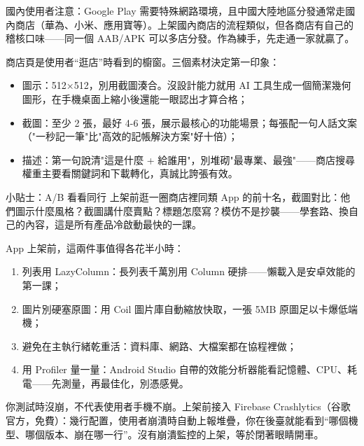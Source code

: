 國內使用者注意：Google Play 需要特殊網路環境，且中國大陸地區分發通常走國內商店（華為、小米、應用寶等）。上架國內商店的流程類似，但各商店有自己的稽核口味——同一個 AAB/APK 可以多店分發。作為練手，先走通一家就贏了。


商店頁是使用者“逛店”時看到的櫥窗。三個素材決定第一印象：

\begin{itemize}
  \item 圖示：512×512，別用截圖湊合。沒設計能力就用 AI 工具生成一個簡潔幾何圖形，在手機桌面上縮小後還能一眼認出才算合格；
  \item 截圖：至少 2 張，最好 4-6 張，展示最核心的功能場景；每張配一句人話文案（"一秒記一筆"比"高效的記帳解決方案"好十倍）；
  \item 描述：第一句說清"這是什麼 + 給誰用"，別堆砌"最專業、最強"——商店搜尋權重主要看關鍵詞和下載轉化，真誠比誇張有效。
\end{itemize}

\begin{tcbinfo}{小貼士：A/B 看看同行}
上架前逛一圈商店裡同類 App 的前十名，截圖對比：他們圖示什麼風格？截圖講什麼賣點？標題怎麼寫？模仿不是抄襲——學套路、換自己的內容，這是所有產品冷啟動最快的一課。

\end{tcbinfo}


App 上架前，這兩件事值得各花半小時：


\begin{enumerate}
  \item 列表用 LazyColumn：長列表千萬別用 Column 硬排——懶載入是安卓效能的第一課；
  \item 圖片別硬塞原圖：用 Coil 圖片庫自動縮放快取，一張 5MB 原圖足以卡爆低端機；
  \item 避免在主執行緒乾重活：資料庫、網路、大檔案都在協程裡做；
  \item 用 Profiler 量一量：Android Studio 自帶的效能分析器能看記憶體、CPU、耗電——先測量，再最佳化，別憑感覺。
\end{enumerate}


你測試時沒崩，不代表使用者手機不崩。上架前接入 Firebase Crashlytics（谷歌官方，免費）：幾行配置，使用者崩潰時自動上報堆疊，你在後臺就能看到“哪個機型、哪個版本、崩在哪一行”。沒有崩潰監控的上架，等於閉著眼睛開車。

